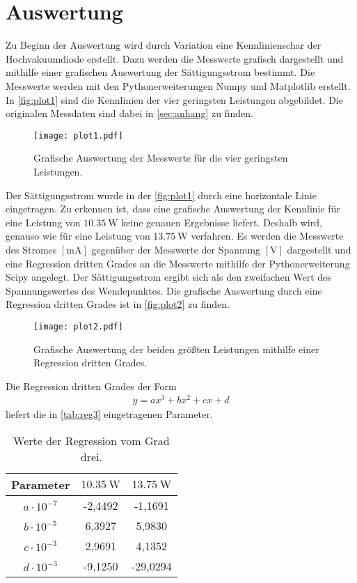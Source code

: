 \section{Auswertung}
\label{sec:Auswertung}

Zu Beginn der Auswertung wird durch Variation eine Kennlinienschar der Hochvakuumdiode erstellt. Dazu werden die Messwerte grafisch dargestellt und mithilfe einer grafischen Auswertung der Sättigungsstrom bestimmt.
Die Messwerte werden mit den Pythonerweiterungen Numpy \cite{numpy} und Matplotlib \cite{matplotlib} erstellt.
In \autoref{fig:plot1} sind die Kennlinien der vier geringsten Leistungen abgebildet. Die originalen Messdaten sind dabei in \autoref{sec:anhang} zu finden.

\begin{figure}
  \centering
  \texttt{[image: plot1.pdf]}
  \caption{Grafische Auswertung der Messwerte für die vier geringsten Leistungen.}
  \label{fig:plot1}
\end{figure}

\noindent
Der Sättigungsstrom wurde in der \autoref{fig:plot1} durch eine horizontale Linie eingetragen. 
Zu erkennen ist, dass eine grafische Auswertung der Kennlinie für eine Leistung von
$\SI{10,35}{\watt}$ keine genauen Ergebnisse liefert. Deshalb wird, genauso wie für eine Leistung von $\SI{13,75}{\watt}$ verfahren.
Es werden die Messwerte des Stromes $[\si{\milli\ampere}]$ gegenüber der Messwerte der Spannung $[\si{\volt}]$ dargestellt und eine Regression dritten Grades an die Messwerte mithilfe der Pythonerweiterung
Scipy \cite{scipy} angelegt. Der Sättigungsstrom ergibt sich als den zweifachen Wert des Spannungswertes des Wendepunktes.
Die grafische Auswertung durch eine Regression dritten Grades ist in \autoref{fig:plot2} zu finden.

\begin{figure}
  \centering
  \texttt{[image: plot2.pdf]}
  \caption{Grafische Auswertung der beiden größten Leistungen mithilfe einer Regression dritten Grades.}
  \label{fig:plot2}
\end{figure}

\noindent
Die Regression dritten Grades der Form
\begin{align*}
  y = ax^3+bx^2+cx+d  
\end{align*}
liefert die in \autoref{tab:reg3} eingetragenen Parameter.

\begin{table}[H]
  \caption{Werte der Regression vom Grad drei.}
  \label{tab:reg3}
  \centering
  \begin{tabular}{c c c}
      \toprule
      Parameter & $\SI{10,35}{\watt}$ & $\SI{13,75}{\watt}$ \\
      \midrule
      $a \cdot 10^{-7}$ & -2,4492 & -1,1691 \\
      $b \cdot 10^{-5}$ & 6,3927 & 5,9830 \\
      $c \cdot 10^{-3}$ & 2,9691 & 4,1352 \\
      $d \cdot 10^{-3}$ & -9,1250 & -29,0294 \\
      \bottomrule
    \end{tabular}
\end{table}

